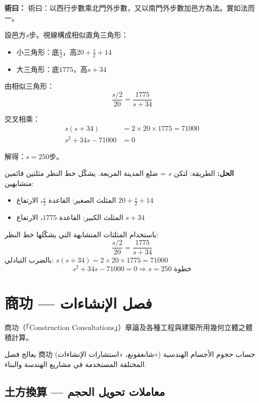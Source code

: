 \documentclass[11pt,a4paper]{article}
\newcommand{\ar}[1]{\arabicfont\beginR #1\endR}
\newcommand{\ChinCol}[1]{\begin{minipage}[t]{0.48\textwidth}#1\end{minipage}}
\newcommand{\ArabCol}[1]{\begin{minipage}[t]{0.48\textwidth}\arabicfont\beginR #1\endR\end{minipage}}
\newcommand{\parallelsection}[2]{%
  \noindent\ChinCol{#1}\hfill\ArabCol{#2}\par\vspace{0.5cm}%
}
\newcounter{probnum}
\newcommand{\working}[2]{\par\noindent%
  \begin{minipage}[t]{0.48\textwidth}\textbf{術曰：}#1\end{minipage}%
  \hfill%
  \begin{minipage}[t]{0.48\textwidth}\arabicfont\beginR\textbf{الحل:} #2\endR\end{minipage}\par\vspace{0.2cm}}
\begin{document}
\working{%
術曰：以西行步數乘北門外步數，又以南門外步數加邑方為法。實如法而一。

設邑方$s$步。視線構成相似直角三角形：
\begin{itemize}[leftmargin=1em,topsep=0pt]
  \item 小三角形：底$\frac{s}{2}$，高$20 + \frac{s}{2} + 14$
  \item 大三角形：底$1775$，高$s + 34$
\end{itemize}

由相似三角形：
\[
\frac{s/2}{20} = \frac{1775}{s + 34}
\]

交叉相乘：
\begin{align*}
s(s + 34) &= 2 \times 20 \times 1775 = 71000 \\
s^2 + 34s - 71000 &= 0
\end{align*}

解得：$s = 250$步。%
}{%
الطريقة: لتكن $s$ = ضلع المدينة المربعة. يشكّل خط النظر مثلثين قائمين متشابهين:
\begin{itemize}[leftmargin=1em,topsep=0pt]
  \item المثلث الصغير: القاعدة $\frac{s}{2}$، الارتفاع $20 + \frac{s}{2} + 14$
  \item المثلث الكبير: القاعدة $1775$، الارتفاع $s + 34$
\end{itemize}
باستخدام المثلثات المتشابهة التي يشكّلها خط النظر:
\[
\frac{s/2}{20} = \frac{1775}{s + 34}
\]
بالضرب التبادلي: $s(s + 34) = 2 \times 20 \times 1775 = 71000$
\[
s^2 + 34s - 71000 = 0 \Rightarrow s = 250 \text{ خطوة}
\]%
}

\newpage

\setcounter{probnum}{0}

\section{商功 --- \ar{فصل الإنشاءات}}
\label{sec:shanggong}

\parallelsection{%
商功（「Construction Consultations」）章論及各種工程與建築所用幾何立體之體積計算。%
}{%
يعالج فصل 商功 (شانغقونغ، «استشارات الإنشاءات») حساب حجوم الأجسام الهندسية المختلفة المستخدمة في مشاريع الهندسة والبناء.%
}

\subsection{土方換算 --- \ar{معاملات تحويل الحجم}}
\end{document}
